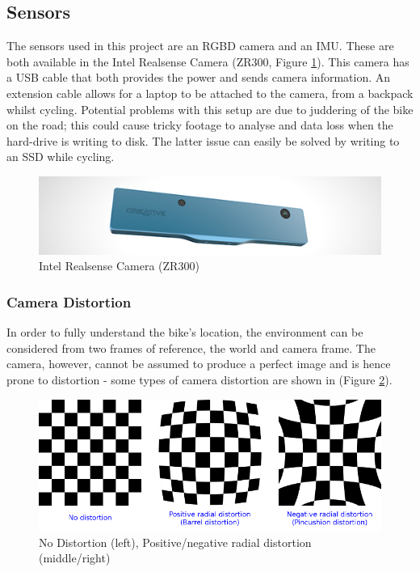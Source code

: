 \documentclass[11pt,twoside]{report}
\begin{document}
\subsection{Sensors}
The sensors used in this project are an RGBD camera and an IMU. These are both available in the Intel Realsense Camera (ZR300, Figure \ref{realsense_camera}). This camera has a USB cable that both provides the power and sends camera information. An extension cable allows for a laptop to be attached to the camera, from a backpack whilst cycling. Potential problems with this setup are due to juddering of the bike on the road; this could cause tricky footage to analyse and data loss when the hard-drive is writing to disk. The latter issue can easily be solved by writing to an SSD while cycling.

\noindent \begin{figure}[h!]
	\includegraphics[width = 1.0\hsize]{./figures/intel_realsense.jpg}
	\caption{Intel Realsense Camera (ZR300)}
	\label{realsense_camera}
\end{figure}

\subsubsection{Camera Distortion}
In order to fully understand the bike's location, the environment can be considered from two frames of reference, the world and camera frame. The camera, however, cannot be assumed to produce a perfect image and is hence prone to distortion - some types of camera distortion are shown in (Figure \ref{distortion}).


\noindent \begin{figure}[h!]
	\includegraphics[width = 1\hsize]{figures/distortion_example.png} 
	\caption{No Distortion (left)\cite{opencv_camera_article}, Positive/negative radial distortion (middle/right)}
	\label{distortion}
\end{figure}
\end{document}
